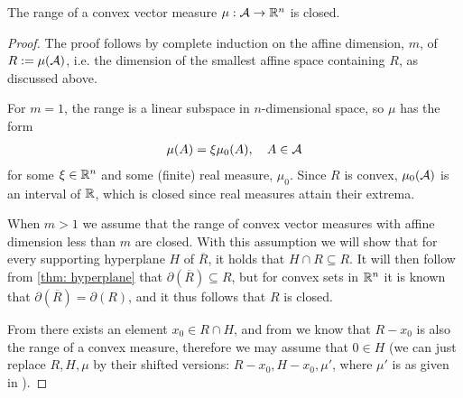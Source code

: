 \documentclass[../../main.tex]{subfiles}
\begin{document}
\begin{lemma}\label{lem: convex means closed}
The range of a convex vector measure $\mu:\mathcal{A}\to \mathbb{R}^{n}$ is closed.
\end{lemma}
\begin{proof}
The proof follows by complete induction on the affine dimension, $m$, of $R:=\mu(\mathcal{A})$, i.e. the dimension of the smallest affine space containing $R$, as discussed above.

For $m=1$, the range is a linear subspace in $n$-dimensional space, so $\mu$ has the form
\begin{align*}
	\mu(A)=\xi \mu_{0}(A), \quad A\in \mathcal{A}
\end{align*}
for some $\xi\in \mathbb{R}^{n}$ and some (finite) real measure, $\mu_{0}$. Since $R$ is convex, $\mu_{0}(\mathcal{A})$ is an interval of $\mathbb{R}$, which is closed since real measures attain their extrema.

When $m>1$ we assume that the range of convex vector measures with affine dimension less than $m$ are closed.
With this assumption we will show that for every supporting hyperplane $H$ of $\overline{R}$, it holds that $H\cap R\subseteq R$. It will then follow from \cref{thm: hyperplane} that $\partial(\overline{R})\subseteq R$, but for convex sets in $\mathbb{R}^{n}$ it is known that $\partial(\overline{R})=\partial(R)$, and it thus follows that $R$ is closed.

From  there exists an element $x_{0}\in R\cap H$, and from  we know that $R-x_{0}$ is also the range of a convex measure, therefore we may assume that $0\in H$ (we can just replace $R,H,\mu$ by their shifted versions: $R-x_{0},H-x_{0},\mu'$, where $\mu'$ is as given in ).


\end{proof}
\end{document}
